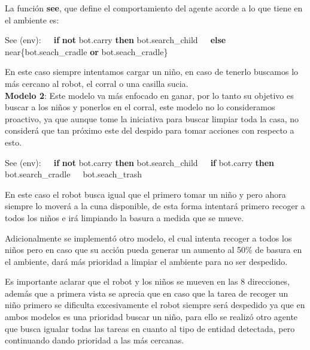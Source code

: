\documentclass[a4paper,10pt,twocolumn]{article}
\begin{document}
La funci\'on \textbf{see}, que define el comportamiento del agente acorde a lo que tiene en el ambiente es:

\begin{algorithm}
	\begin{algorithmic}
		\STATE See (env):
		\STATE $\;\;\;$ \textbf{if} \textbf{not} bot.carry \textbf{then} bot.search\_child
		\STATE $\;\;\;$ \textbf{else} near\{{bot.seach\_cradle} \textbf{or} bot.seach\_cradle\}
	\end{algorithmic}
\end{algorithm}

En este caso siempre intentamos cargar un ni\~no, en caso de tenerlo buscamos lo m\'as cercano al robot, el corral o una casilla sucia.\\

\textbf{Modelo 2}: Este modelo va m\'as enfocado en ganar, por lo tanto su objetivo es buscar a los ni\~nos y ponerlos en el corral, este modelo no lo consideramos proactivo, ya que aunque tome la iniciativa para buscar limpiar toda la casa, no consider\'a que tan pr\'oximo este del despido para tomar acciones con respecto a esto. 

\begin{algorithm}
	\begin{algorithmic}
		\STATE See (env):
		\STATE $\;\;\;$ \textbf{if} \textbf{not} bot.carry \textbf{then} bot.search\_child
		\STATE $\;\;\;$ \textbf{if} bot.carry \textbf{then} bot.search\_cradle
		\STATE $\;\;\;$ bot.seach\_trash
	\end{algorithmic}
\end{algorithm}

En este caso el robot busca igual que el primero tomar un ni\~no y pero ahora siempre lo mover\'a a la cuna disponible, de esta forma intentar\'a primero recoger a todos los ni\~nos e ir\'a limpiando la basura a medida que se mueve.

Adicionalmente se implement\'o otro modelo, el cual intenta recoger a todos los ni\~nos pero en caso que su acci\'on pueda generar un aumento al 50\% de basura en el ambiente, dar\'a m\'as prioridad a limpiar el ambiente para no ser despedido. 

Es importante aclarar que el robot y los ni\~nos se mueven en las 8 direcciones, adem\'as que a primera vista se aprecia que en caso que la tarea de recoger un ni\~no primero se dificulta excesivamente el robot siempre ser\'a despedido ya que en ambos modelos es una prioridad buscar un ni\~no, para ello se realiz\'o otro agente que busca igualar todas las tareas en cuanto al tipo de entidad detectada, pero continuando dando prioridad a las m\'as cercanas.
\end{document}
